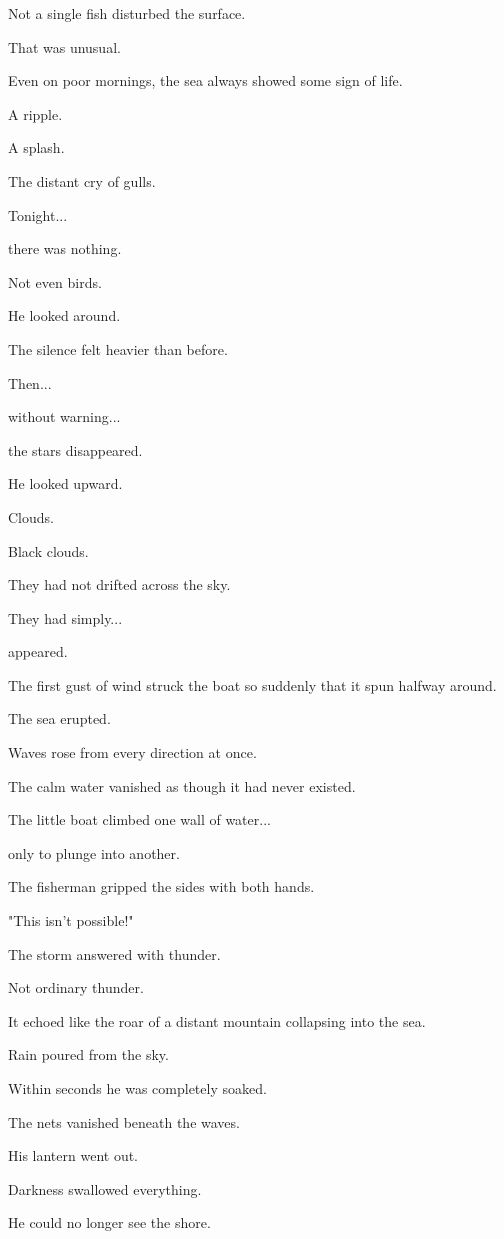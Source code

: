 \documentclass[12pt,openany]{book}
\begin{document}
Not a single fish disturbed the surface.

That was unusual.

Even on poor mornings, the sea always showed some sign of life.

A ripple.

A splash.

The distant cry of gulls.

Tonight...

there was nothing.

Not even birds.

He looked around.

The silence felt heavier than before.

Then...

without warning...

the stars disappeared.

He looked upward.

Clouds.

Black clouds.

They had not drifted across the sky.

They had simply...

appeared.

The first gust of wind struck the boat so suddenly that it spun halfway around.

The sea erupted.

Waves rose from every direction at once.

The calm water vanished as though it had never existed.

The little boat climbed one wall of water...

only to plunge into another.

The fisherman gripped the sides with both hands.

"This isn't possible!"

The storm answered with thunder.

Not ordinary thunder.

It echoed like the roar of a distant mountain collapsing into the sea.

Rain poured from the sky.

Within seconds he was completely soaked.

The nets vanished beneath the waves.

His lantern went out.

Darkness swallowed everything.

He could no longer see the shore.
\end{document}
